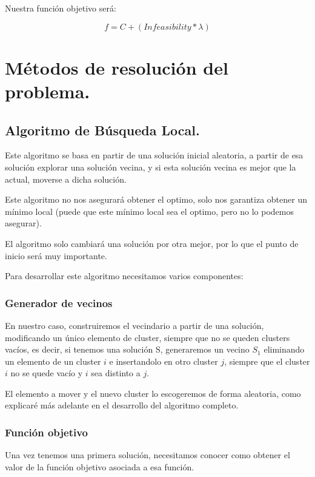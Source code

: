 \documentclass[12pt, spanish]{article}
\begin{document}
Nuestra función objetivo será:

$$ f = C + (\textit{Infeasibility} * \lambda) $$ 


\newpage

\section{Métodos de resolución del problema.}

\subsection{Algoritmo de Búsqueda Local.}

Este algoritmo se basa en partir de una solución inicial aleatoria, a partir de esa solución explorar una solución vecina, y si esta solución vecina es mejor que la actual, moverse a dicha solución.

Este algoritmo no nos asegurará obtener el optimo, solo nos garantiza obtener un mínimo local (puede que este mínimo local sea el optimo, pero no lo podemos asegurar).

El algoritmo solo cambiará una solución por otra mejor, por lo que el punto de inicio será muy importante.

Para desarrollar este algoritmo necesitamos varios componentes:
 
 
\subsubsection{Generador de vecinos}

En nuestro caso, construiremos el vecindario a partir de una solución, modificando un único elemento de cluster, siempre que no se queden clusters vacíos, es decir, si tenemos una solución S, generaremos un vecino $S_1$ eliminando un elemento de un cluster $i$ e insertandolo en otro cluster $j$, siempre que el cluster $i$ no se quede vacío y $i$ sea distinto a $j$.

El elemento a mover y el nuevo cluster lo escogeremos de forma aleatoria, como explicaré más adelante en el desarrollo del algoritmo completo.

 
\subsubsection{Función objetivo} 
 
Una vez tenemos una primera solución, necesitamos conocer como obtener el valor de la función objetivo asociada a esa función.
\end{document}
